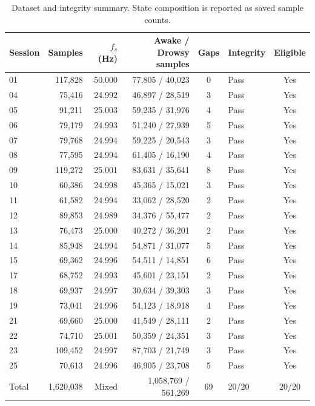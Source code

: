 \begin{table}[p]
\centering
\small
\setlength{\tabcolsep}{3pt}
\renewcommand{\arraystretch}{1.12}
\caption{Dataset and integrity summary. State composition is reported as saved sample counts.}
\label{tab:supp_dataset}
\begin{tabular}{lrrrclc}
\toprule
Session & Samples & $f_s$ (Hz) & Awake / Drowsy samples & Gaps & Integrity & Eligible \\
\midrule
01 & 117,828 & 50.000 & 77,805 / 40,023 & 0 & Pass & Yes \\
04 & 75,416 & 24.992 & 46,897 / 28,519 & 3 & Pass & Yes \\
05 & 91,211 & 25.003 & 59,235 / 31,976 & 4 & Pass & Yes \\
06 & 79,179 & 24.993 & 51,240 / 27,939 & 5 & Pass & Yes \\
07 & 79,768 & 24.994 & 59,225 / 20,543 & 3 & Pass & Yes \\
08 & 77,595 & 24.994 & 61,405 / 16,190 & 4 & Pass & Yes \\
09 & 119,272 & 25.001 & 83,631 / 35,641 & 8 & Pass & Yes \\
10 & 60,386 & 24.998 & 45,365 / 15,021 & 3 & Pass & Yes \\
11 & 61,582 & 24.994 & 33,062 / 28,520 & 2 & Pass & Yes \\
12 & 89,853 & 24.989 & 34,376 / 55,477 & 2 & Pass & Yes \\
13 & 76,473 & 25.000 & 40,272 / 36,201 & 2 & Pass & Yes \\
14 & 85,948 & 24.994 & 54,871 / 31,077 & 5 & Pass & Yes \\
15 & 69,362 & 24.996 & 54,511 / 14,851 & 6 & Pass & Yes \\
17 & 68,752 & 24.993 & 45,601 / 23,151 & 2 & Pass & Yes \\
18 & 69,937 & 24.997 & 30,634 / 39,303 & 3 & Pass & Yes \\
19 & 73,041 & 24.996 & 54,123 / 18,918 & 4 & Pass & Yes \\
21 & 69,660 & 25.000 & 41,549 / 28,111 & 2 & Pass & Yes \\
22 & 74,710 & 25.001 & 50,359 / 24,351 & 3 & Pass & Yes \\
23 & 109,452 & 24.997 & 87,703 / 21,749 & 3 & Pass & Yes \\
25 & 70,613 & 24.996 & 46,905 / 23,708 & 5 & Pass & Yes \\
\midrule
Total & 1,620,038 & Mixed & 1,058,769 / 561,269 & 69 & 20/20 & 20/20 \\
\bottomrule
\end{tabular}

\end{table}
